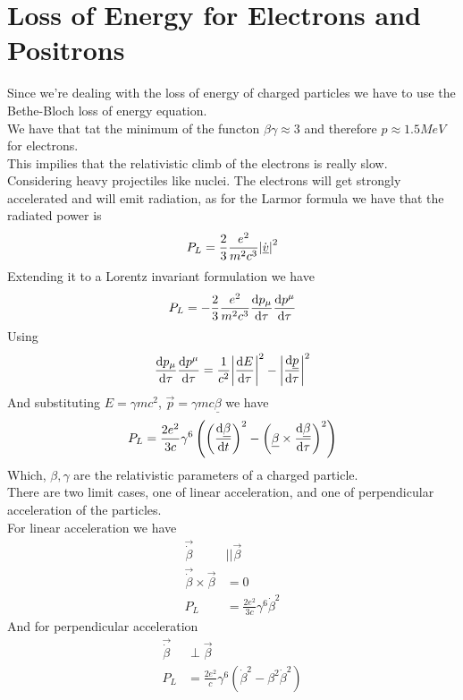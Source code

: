 \documentclass[../qm.tex]{subfiles}
\begin{document}
\section{Loss of Energy for Electrons and Positrons}
Since we're dealing with the loss of energy of charged particles we have to use the Bethe-Bloch loss of energy equation.\\
We have that tat the minimum of the functon $\beta\gamma\approx3$ and therefore $p\approx1.5\unit{MeV}$ for electrons.\\
This impilies that the relativistic climb of the electrons is really slow.\\
Considering heavy projectiles like nuclei. The electrons will get strongly accelerated and will emit radiation, as for the Larmor formula we have that the radiated power is
\begin{equation}
	P_L=\frac{2}{3}\frac{e^2}{m^2c^3}\abs{\dot{\underline{v}}}^2
	\label{eq:larmorpower}
\end{equation}
Extending it to a Lorentz invariant formulation we have
\begin{equation*}
	P_L=-\frac{2}{3}\frac{e^2}{m^2c^3}\dv{p_\mu}{\tau}\dv{p^\mu}{\tau}
\end{equation*}
Using
\begin{equation*}
	\dv{p_\mu}{\tau}\dv{p^\mu}{\tau}=\frac{1}{c^2}\abs{\dv{E}{\tau}}^2-\abs{\dv{\underline{p}}{\tau}}^2
\end{equation*}
And substituting $E=\gamma mc^2$, $\vec{p}=\gamma mc\underline{\beta}$ we have
\begin{equation}
	P_L=\frac{2e^2}{3c}\gamma^6\left( \left( \dv{\underline{\beta}}{t} \right)^2-\left( \underline{\beta}\times\dv{\underline{\beta}}{\tau} \right)^2 \right)
	\label{eq:relativisticlarmor}
\end{equation}
Which, $\beta,\gamma$ are the relativistic parameters of a charged particle.\\
There are two limit cases, one of linear acceleration, and one of perpendicular acceleration of the particles.\\
For linear acceleration we have
\begin{equation*}
	\begin{aligned}
		\vec{\dot{\beta}}&||\vec{\beta}\\
		\vec{\dot{\beta}}\times\vec{\beta}&=0\\
		P_L&=\frac{2e^2}{3c}\gamma^6\dot{\beta}^2
	\end{aligned}
\end{equation*}
And for perpendicular acceleration
\begin{equation*}
	\begin{aligned}
		\vec{\dot{\beta}}&\perp\vec{\beta}\\
		P_L&=\frac{2e^2}{c}\gamma^6\left( \dot{\beta}^2-\beta^2\dot{\beta}^ 2 \right)
	\end{aligned}
\end{equation*}
\end{document}
